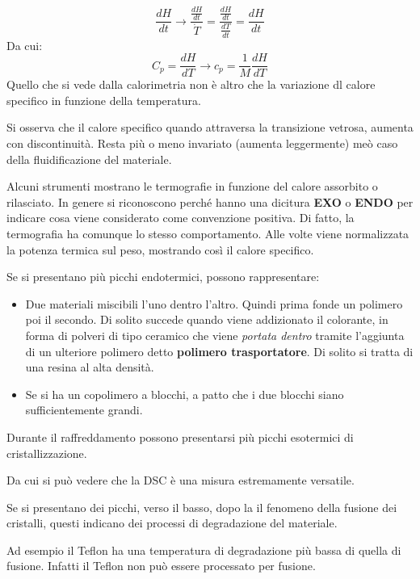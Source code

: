 \begin{equation}
\frac{dH}{dt} \rightarrow \frac{\frac{dH}{dt}}{\dot{T}} = \frac{\frac{dH}{dt}}{\frac{dT}{dt}} = \frac{dH}{dt}
\end{equation}
Da cui:
\begin{equation}
C_p = \frac{dH}{dT} \rightarrow c_p = \frac{1}{M}\frac{dH}{dT}
\end{equation}
Quello che si vede dalla calorimetria non è altro che la variazione dl calore specifico in funzione della temperatura.

Si osserva che il calore specifico quando attraversa la transizione vetrosa, aumenta con discontinuità. Resta più o meno invariato (aumenta leggermente) meò caso della fluidificazione del materiale.

Alcuni strumenti mostrano le termografie in funzione del calore assorbito o rilasciato. In genere si riconoscono perché hanno una dicitura \textbf{EXO} o \textbf{ENDO} per indicare cosa viene considerato come convenzione positiva.
Di fatto, la termografia ha comunque lo stesso comportamento.
Alle volte viene normalizzata la potenza termica sul peso, mostrando così il calore specifico.

Se si presentano più picchi endotermici, possono rappresentare:
\begin{itemize}
\item Due materiali miscibili l'uno dentro l'altro. Quindi prima fonde un polimero poi il secondo. Di solito succede quando viene addizionato il colorante, in forma di polveri di tipo ceramico che viene \textit{portata dentro} tramite l'aggiunta di un ulteriore polimero detto \textbf{polimero trasportatore}. Di solito si tratta di una resina al alta densità.
\item Se si ha un copolimero a blocchi, a patto che i due blocchi siano sufficientemente grandi.
\end{itemize}

Durante il raffreddamento possono presentarsi più picchi esotermici di cristallizzazione.

Da cui si può vedere che la \ac{DSC} è una misura estremamente versatile.

Se si presentano dei picchi, verso il basso, dopo la il fenomeno della fusione dei cristalli, questi indicano dei processi di degradazione del materiale.

Ad esempio il Teflon ha una temperatura di degradazione più bassa di quella di fusione. Infatti il Teflon non può essere processato per fusione.